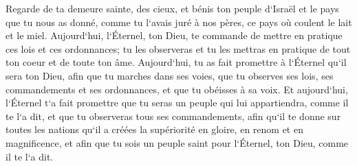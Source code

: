 \verse Regarde de ta demeure sainte, des cieux, et bénis ton peuple d`Israël et le pays que tu nous as donné, comme tu l`avais juré à nos pères, ce pays où coulent le lait et le miel. 
\verse Aujourd`hui, l`Éternel, ton Dieu, te commande de mettre en pratique ces lois et ces ordonnances; tu les observeras et tu les mettras en pratique de tout ton coeur et de toute ton âme. 
\verse Aujourd`hui, tu as fait promettre à l`Éternel qu`il sera ton Dieu, afin que tu marches dans ses voies, que tu observes ses lois, ses commandements et ses ordonnances, et que tu obéisses à sa voix. 
\verse Et aujourd`hui, l`Éternel t`a fait promettre que tu seras un peuple qui lui appartiendra, comme il te l`a dit, et que tu observeras tous ses commandements, 
\verse afin qu`il te donne sur toutes les nations qu`il a créées la supériorité en gloire, en renom et en magnificence, et afin que tu sois un peuple saint pour l`Éternel, ton Dieu, comme il te l`a dit. 


